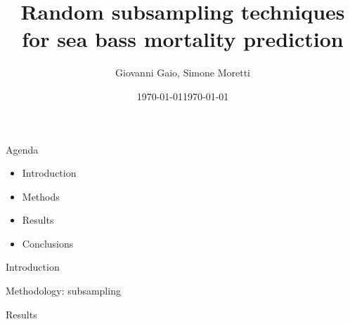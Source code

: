 \documentclass[aspectratio=169]{beamer}
\title{Random subsampling techniques for sea bass mortality prediction}
\author{Giovanni Gaio, Simone Moretti}
\date{\today}
\subtitle{}
\date{\today}
\begin{document}
\frame{\titlepage}

\begin{frame}{Agenda}
    \begin{itemize}
        \item Introduction
        \item Methods
        \item Results 
        \item Conclusions 
    \end{itemize}
\end{frame}


\begin{frame}{Introduction}
\end{frame}

\begin{frame}{Methodology: subsampling}
\end{frame}

\begin{frame}{Results}
\end{frame}
\end{document}
